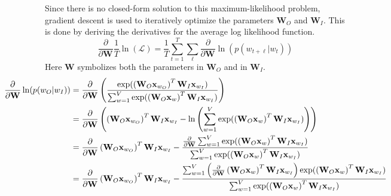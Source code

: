 
Since there is no closed-form solution to this maximum-likelihood problem, gradient descent is used to iteratively optimize the parameters $\mathbf{W}_O$ and $\mathbf{W}_I$. This is done by deriving the derivatives for the average log likelihood function. 
\begin{equation}
\frac{\partial}{\partial \mathbf{W}} \frac{1}{T} \ln( \mathcal{L} ) = \frac{1}{T} \sum_{t = 1}^T \sum_{\ell} \frac{\partial}{\partial \mathbf{W}} \ln( p(w_{t + \ell} | w_t) )
\end{equation}
Here $\mathbf{W}$ symbolizes both the parameters in $\mathbf{W}_O$ and in $\mathbf{W}_I$. 
\begin{equation*}
\centerline{$
\begin{aligned}
\frac{\partial}{\partial \mathbf{W}} \ln( p(w_O | w_I) ) &= \frac{\partial}{\partial \mathbf{W}} 	 \left( \frac{
	\mathrm{exp}( \left( \mathbf{W}_O \mathbf{x}_{w_O} \right)^T \mathbf{W}_I \mathbf{x}_{w_I} )
}{
	\sum_{w=1}^V \mathrm{exp}( \left( \mathbf{W}_O \mathbf{x}_{w} \right)^T \mathbf{W}_I \mathbf{x}_{w_I} )
} \right) \\
&= \frac{\partial}{\partial \mathbf{W}} \left( \left( \mathbf{W}_O \mathbf{x}_{w_O} \right)^T \mathbf{W}_I \mathbf{x}_{w_I} - \ln \left(\sum_{w=1}^V \mathrm{exp}( \left( \mathbf{W}_O \mathbf{x}_{w} \right)^T \mathbf{W}_I \mathbf{x}_{w_I}) \right) \right) \\
&= \frac{\partial}{\partial \mathbf{W}} \left( \mathbf{W}_O \mathbf{x}_{w_O} \right)^T \mathbf{W}_I \mathbf{x}_{w_I} - \frac{
	\frac{\partial}{\partial \mathbf{W}} \sum_{w=1}^V \mathrm{exp}( \left( \mathbf{W}_O \mathbf{x}_{w} \right)^T \mathbf{W}_I \mathbf{x}_{w_I})
} {
	\sum_{w=1}^V \mathrm{exp}( \left( \mathbf{W}_O \mathbf{x}_{w} \right)^T \mathbf{W}_I \mathbf{x}_{w_I})
} \\
&= \frac{\partial}{\partial \mathbf{W}} \left( \mathbf{W}_O \mathbf{x}_{w_O} \right)^T \mathbf{W}_I \mathbf{x}_{w_I} - \frac{
	\sum_{w=1}^V \left(\frac{\partial}{\partial \mathbf{W}} \left(\mathbf{W}_O \mathbf{x}_{w} \right)^T \mathbf{W}_I \mathbf{x}_{w_I} \right) \mathrm{exp}( \left( \mathbf{W}_O \mathbf{x}_{w} \right)^T \mathbf{W}_I \mathbf{x}_{w_I})
} {
	\sum_{w=1}^V \mathrm{exp}( \left( \mathbf{W}_O \mathbf{x}_{w} \right)^T \mathbf{W}_I \mathbf{x}_{w_I})
}
\end{aligned}$}
\end{equation*}

